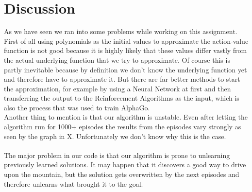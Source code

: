 \documentclass{article}
\begin{document}
	\section{Discussion}
	As we have seen we ran into some problems while working on this assignment. First of all using polynomials as the initial values to approximate the action-value function is not good because it is highly likely that these values differ vastly from the actual underlying function that we try to approximate. Of course this is partly inevitable because by definition we don't know the underlying function yet and therefore have to approximate it. But there are far better methods to start the approximation, for example by using a Neural Network at first and then transferring the output to the Reinforcement Algorithms as the input, which is also the process that was used to train AlphaGo. 
	\\
	Another thing to mention is that our algorithm is unstable. Even after letting the algorithm run for 1000+ episodes the results from the episodes vary strongly as seen by the graph in X. Unfortunately we don't know why this is the case. \\
	\\
	The major problem in our code is that our algorithm is prone to unlearning previously learned solutions. It may happen that it discovers a good way to drive upon the mountain, but the solution gets overwritten by the next episodes and therefore unlearns what brought it to the goal. 
	
	
	
	
	
	
\end{document}
